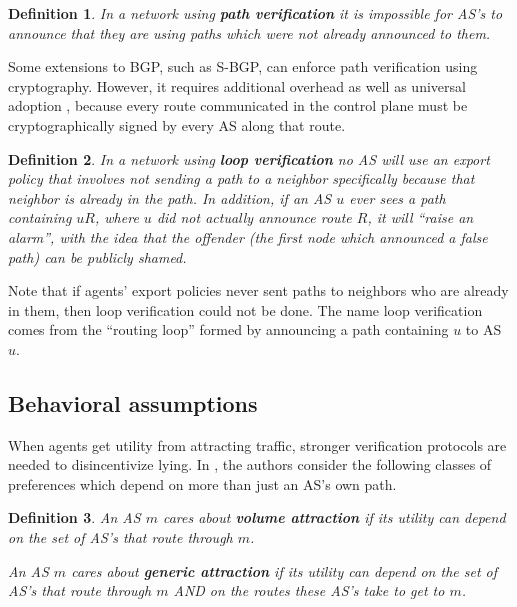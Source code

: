 \documentclass[pdftex,twoside,twocolumn,10pt,letterpaper]{article}
\newtheorem{definition}{Definition}
\begin{document}
    \begin{definition} 
      In a network using \textbf{path verification} it is
      impossible for AS's to announce that they are using paths which were not
      already announced to them.
    \end{definition}

    Some extensions to BGP, such as S-BGP, can enforce path verification
    using cryptography.
    However, it requires additional overhead as well as universal adoption
    \cite{PartialDeploy}, because every route communicated in the control plane
    must be cryptographically signed by every AS along that route.

    \begin{definition}
      In a network using \textbf{loop verification} no AS will
      use an export policy that involves not sending a path to a neighbor
      specifically because that neighbor is already in the path.
      In addition, if an AS $u$ ever sees a path containing $uR$, 
      where $u$ did not actually announce route $R$, it will
      ``raise an alarm'', with the idea that the offender (the first
      node which announced a false path) can be publicly shamed.
    \end{definition}

    Note that if agents' export policies never sent paths to neighbors who are
    already in them, then loop verification could not be done.
    The name loop verification comes from the ``routing loop'' formed by
    announcing a path containing $u$ to AS $u$.

  \subsection{Behavioral assumptions}
    When agents get utility from attracting traffic, stronger verification
    protocols are needed to disincentivize lying.
    In \cite{Attraction}, the authors consider the following classes of
    preferences which depend on more than just an AS's own path.

    \begin{definition}
      An AS $m$ cares about \textbf{volume attraction} if its utility can depend on
      the set of AS's that route through $m$.

      An AS $m$ cares about \textbf{generic attraction} if its utility can depend on
      the set of AS's that route through $m$ AND on the routes these AS's take to get to $m$.
    \end{definition}
\end{document}
